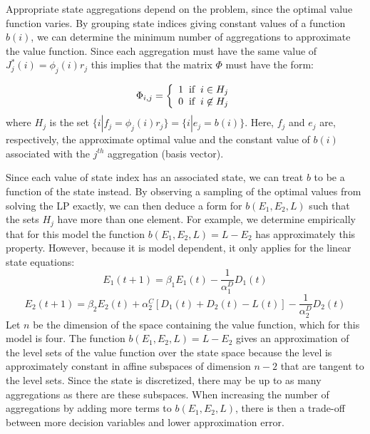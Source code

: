 \documentclass[conference]{IEEEtran}
\begin{document}
    Appropriate state aggregations depend on the problem, since the optimal value function varies. By grouping state indices giving constant values of a function $b(i)$, we can determine the minimum number of aggregations to approximate the value function. Since each aggregation must have the same value of $J^{*}_{j}(i) = \phi_{j}(i)r_{j}$ this implies that the matrix $\Phi$ must have the form:
    
    \begin{displaymath}
        \Phi_{i,j}=\left\{
            \begin{array}{l}
            1 \hspace{0.2cm} \text{if} \hspace{0.2cm} i\in H_{j}\\
            0 \hspace{0.2cm} \text{if} \hspace{0.2cm} i\not\in H_{j}
            \end{array}
            \right.
    \end{displaymath}where $H_{j}$ is the set $\{i|f_{j} = \phi_{j}(i)r_{j}\}=\{i|e_{j} = b(i)\}$. Here, $f_{j}$ and $e_{j}$ are, respectively, the approximate optimal value and the constant value of $b(i)$ associated with the $j^{th}$ aggregation (basis vector).
    
    Since each value of state index has an associated state, we can treat $b$ to be a function of the state instead. By observing a sampling of the optimal values from solving the LP exactly, we can then deduce a form for $b(E_{1},E_{2},L)$ such that the sets $H_{j}$ have more than one element. For example, we determine empirically that for this model the function $b(E_{1},E_{2},L)=L-E_{2}$ has approximately this property. However, because it is model dependent, it only applies for the linear state equations:
	\begin{displaymath}E_{1}(t+1)=\beta_{1}E_{1}(t)-\frac{1}{\alpha_{1}^{D}}D_{1}(t)\end{displaymath}
	\begin{displaymath}E_{2}(t+1)=\beta_{2}E_{2}(t)+\alpha_{2}^{C}[D_{1}(t)+D_{2}(t)-L(t)]-\frac{1}{\alpha_{2}^{D}}D_{2}(t)\end{displaymath}	Let $n$ be the dimension of the space containing the value function, which for this model is four. The function $b(E_{1},E_{2},L)=L-E_{2}$ gives an approximation of the level sets of the value function over the state space because the level is approximately constant in affine subspaces of dimension $n-2$ that are tangent to the level sets. Since the state is discretized, there may be up to as many aggregations as there are these subspaces. When increasing the number of aggregations by adding more terms to $b(E_{1},E_{2},L)$, there is then a trade-off between more decision variables and lower approximation error. %
	
\end{document}
